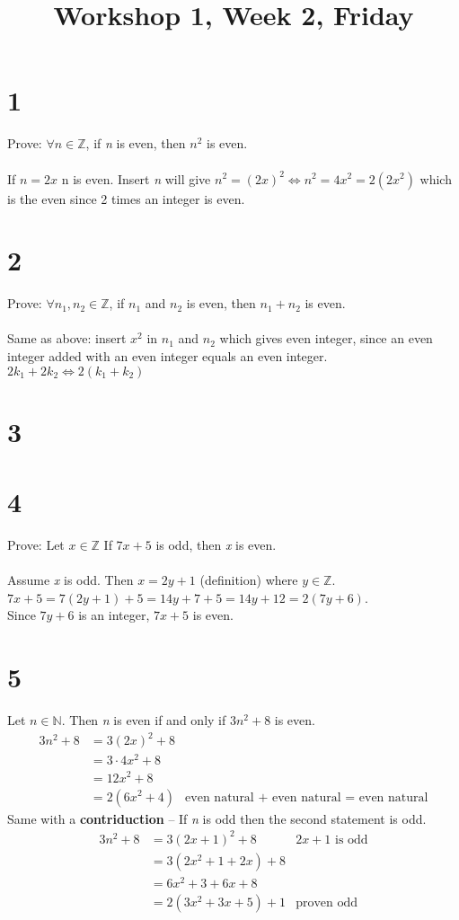 \documentclass[danish,english,10pt,a4paper]{article}
\title{Workshop 1, Week 2, Friday}
\begin{document}
\maketitle

\section*{1}
Prove: $\forall n \in \mathbb{Z}$, if \textit{n} is even, then $n^2$ is even.
\\
\\
If $n= 2x$ n is even. Insert \textit{n} will give $n^2 = (2x)^2 \Leftrightarrow n^2=4x^2=2(2x^2)$ which is the even since 2 times an integer is even.


\section*{2}
Prove: $\forall n_1, n_2 \in \mathbb{Z}$, if $n_1$ and $n_2$ is even, then $n_1+n_2$ is even.
\\
\\
Same as above: insert $x^2$ in $n_1$ and $n_2$ which gives even integer, since an even integer added with an even integer equals an even integer. $2k_1 + 2k_2 \Leftrightarrow 2(k_1+k_2)$


\section*{3}


\section*{4}
Prove: Let $x \in \mathbb{Z}$ If $7x+5$ is odd, then \textit{x} is even.
\\
\\
Assume \textit{x} is odd. Then $x=2y+1$ (definition) where $y \in \mathbb{Z}$.\\
$7x+5 = 7(2y+1)+5 = 14y+7+5 = 14y+12 = 2(7y+6)$. 
\\
Since $7y+6$ is an integer, $7x+5$ is even.


\section*{5}
Let $n \in \mathbb{N}$. Then \textit{n} is even if and only if $3n^2+8$ is even.
\begin{align*}
3n^2+8 &= 3(2x)^2+8\\
	&= 3\cdot 4x^2+8\\
	&= 12x^2+8 \\
	&= 2(6x^2+4) & \text{even natural + even natural = even natural}	
\end{align*}
Same with a \textbf{contriduction} -- If \textit{n} is odd then the second statement is odd.
\begin{align*}
3n^2+8 &= 3(2x+1)^2+8 & 2x+1 \text{ is odd}\\
	&=3(2x^2+1+2x)+8\\
	&=6x^2+3+6x+8\\
	&=2(3x^2+3x+5)+1 & \text{proven odd}
\end{align*}
\end{document}
